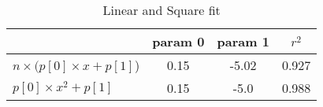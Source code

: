 \documentclass{article}
\begin{document}
\nonstopmode
\setcounter{table}{0}
\begin{table}
\centering
\caption{Linear and Square fit}
\begin{tabular}{|l|ccc|}
\toprule
{} & param 0 & param 1 &  $r^2$ \\
\midrule
$n \times (p[0] \times x + p[1]$) &    0.15 &   -5.02 &  0.927 \\
$p[0] \times x^2 + p[1]$          &    0.15 &    -5.0 &  0.988 \\
\bottomrule
\end{tabular}
\end{table}
\end{document}
